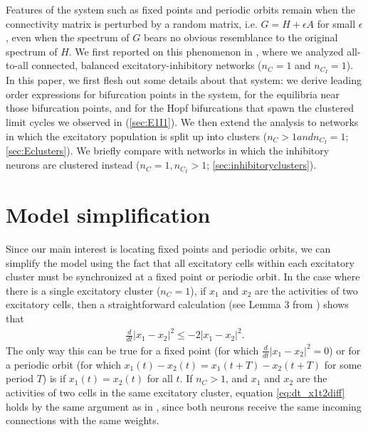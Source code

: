 \documentclass[reqno]{siamonline190516}
\begin{document}
Features of the system such as fixed points and periodic orbits remain when the connectivity matrix is perturbed by a random matrix, i.e. $G=H + \epsilon A$ for small $\epsilon$, even when the spectrum of $G$ bears no obvious resemblance to the original spectrum of $H$. We first reported on this phenomenon in \cite{Barreiro2017}, where we analyzed all-to-all connected, balanced excitatory-inhibitory networks ($n_C = 1$ and $n_{C_I} = 1$). In this paper, we first flesh out some details about that system: we derive leading order expressions for bifurcation points in the system, for the equilibria near those bifurcation points, and for the Hopf bifurcations that spawn the clustered limit cycles we observed in \cite{Barreiro2017} (\cref{sec:E1I1}). We then extend the analysis to networks in which the excitatory population is split up into clusters ($n_C > 1 and n_{C_I}=1$; \cref{sec:Eclusters}). We briefly compare with networks in which the inhibitory neurons are clustered instead ($n_C=1, n_{C_I}>1$; \cref{sec:inhibitoryclusters}). 

\section{Model simplification}\label{sec:simplermodel}

Since our main interest is locating fixed points and periodic orbits, we can simplify the model using the fact that all excitatory cells within each excitatory cluster must be synchronized at a fixed point or periodic orbit. In the case where there is a single excitatory cluster ($n_C = 1$), if $x_1$ and $x_2$ are the activities of two excitatory cells, then a straightforward calculation (see Lemma 3 from \cite{Barreiro2017}) shows that
\begin{align}\label{eq:dt_x1t2diff}
\frac{d}{dt}|x_1 - x_2|^2 \leq -2 |x_1 - x_2 |^2.
\end{align}
The only way this can be true for a fixed point (for which $\frac{d}{dt} |x_1 - x_2|^2 =0$) or for a periodic orbit (for which $x_1(t)-x_2(t) = x_1(t+T)-x_2(t+T)$ for some period $T$) is if $x_1(t) = x_2(t)$ for all $t$. If $n_C > 1$, and $x_1$ and $x_2$ are the activities of two cells in the same excitatory cluster, equation \cref{eq:dt_x1t2diff} holds by the same argument as in \cite{Barreiro2017}, since both neurons receive the same incoming connections with the same weights. 
\end{document}
